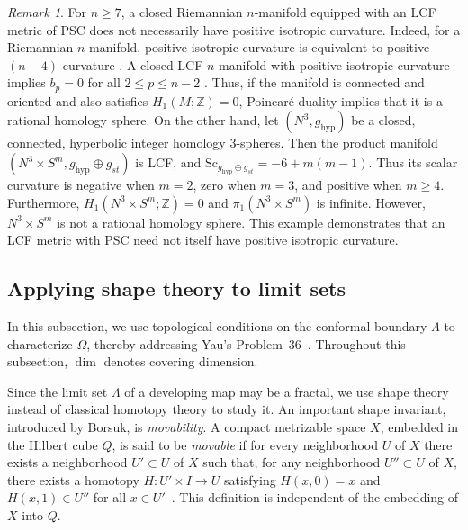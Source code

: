 \documentclass[12pt,oneside,a4paper]{article}
\theoremstyle{mytheorem}
\theoremstyle{remark}
\newtheorem{remark}[definition]{Remark}
\theoremstyle{definition}
\begin{document}
\begin{remark}
For \(n\geq7\), a closed Riemannian \(n\)-manifold equipped with an LCF
metric of PSC does not necessarily have positive isotropic curvature. Indeed, for a  Riemannian \(n\)-manifold, positive isotropic
curvature is equivalent to positive \((n-4)\)-curvature
\cite[Proposition, p.~1470]{LabbiPIC2000}.  A closed LCF $n$-manifold with positive isotropic curvature implies \(b_p=0\) for all \(2\leq p\leq n-2\)
\cite[Corollary~I, p.~1471]{LabbiPIC2000}. Thus, if the manifold is connected
and oriented and also satisfies \(H_1(M;\mathbb Z)=0\), Poincar\'e duality
implies that it is a rational homology sphere. On the other hand, let $(N^3,g_{\mathrm{hyp}})$ be a closed, connected, hyperbolic integer homology $3$-spheres. Then the product manifold
$(N^3\times S^m,g_{\mathrm{hyp}}\oplus g_{st})$ is LCF, and
$\mathrm{Sc}_{g_{\mathrm{hyp}}\oplus g_{st}}=-6+m(m-1)$.
Thus its scalar curvature is negative when $m=2$, zero when $m=3$, and
positive when $m\geq4$. Furthermore,
$H_1(N^3\times S^m;\mathbb Z)=0$ and
$\pi_1(N^3\times S^m)$ is infinite. However, $N^3\times S^m$ is not a
rational homology sphere.
This example demonstrates that an LCF metric with PSC need not itself have positive isotropic curvature.
\end{remark}









\subsection{Applying shape theory to limit sets}
In this subsection, we use topological conditions on the conformal boundary
\(\Lambda\) to characterize \(\Omega\), thereby addressing Yau's
Problem~36~\cite[Problem~36]{MR1216573}.
Throughout this subsection, \(\dim\) denotes covering dimension.

Since the limit set $\Lambda$ of a developing map may be a fractal, we use shape theory instead of classical homotopy theory to study it. An important shape invariant, introduced by Borsuk, is \emph{movability}. A compact metrizable space $X$, embedded in the Hilbert cube $Q$, is said to be \emph{movable} if for every neighborhood $U$ of $X$ there exists a neighborhood $U' \subset U$ of $X$ such that, for any neighborhood $U'' \subset U$ of $X$, there exists a homotopy $H \colon U' \times I \to U$ satisfying $H(x,0)=x$ and $H(x,1) \in U''$ for all $x \in U'$~\cite[Definition~4]{zbMATH07436589}. This definition is independent of the embedding of $X$ into $Q$.
\end{document}
